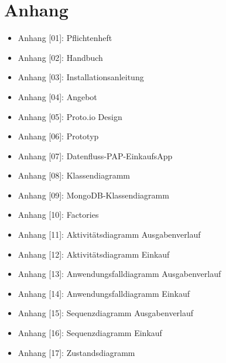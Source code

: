 \documentclass[12pt,a4paper]{article}
\begin{document}
\section*{Anhang}
\begin{itemize}
\item Anhang [01]: Pflichtenheft
\item Anhang [02]: Handbuch
\item Anhang [03]: Installationsanleitung
\item Anhang [04]: Angebot
\item Anhang [05]: Proto.io Design
\item Anhang [06]: Prototyp
\item Anhang [07]: Datenfluss-PAP-EinkaufsApp
\item Anhang [08]: Klassendiagramm
\item Anhang [09]: MongoDB-Klassendiagramm
\item Anhang [10]: Factories
\item Anhang [11]: Aktivitätsdiagramm Ausgabenverlauf
\item Anhang [12]: Aktivitätsdiagramm Einkauf 
\item Anhang [13]: Anwendungsfalldiagramm  Ausgabenverlauf
\item Anhang [14]: Anwendungsfalldiagramm Einkauf 
\item Anhang [15]: Sequenzdiagramm Ausgabenverlauf
\item Anhang [16]: Sequenzdiagramm Einkauf
\item Anhang [17]: Zustandsdiagramm 





\end{itemize}
\end{document}
